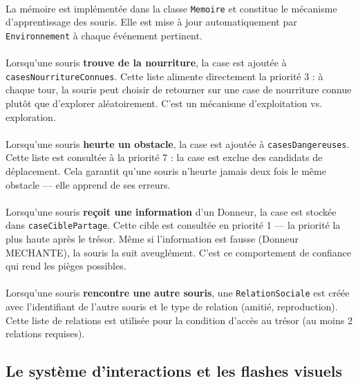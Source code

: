 \paragraph{} La mémoire est implémentée dans la classe \texttt{Memoire} et constitue le mécanisme d'apprentissage des souris. Elle est mise à jour automatiquement par \texttt{Environnement} à chaque événement pertinent.

\paragraph{} Lorsqu'une souris \textbf{trouve de la nourriture}, la case est ajoutée à \texttt{casesNourritureConnues}. Cette liste alimente directement la priorité 3 : à chaque tour, la souris peut choisir de retourner sur une case de nourriture connue plutôt que d'explorer aléatoirement. C'est un mécanisme d'exploitation vs. exploration.

\paragraph{} Lorsqu'une souris \textbf{heurte un obstacle}, la case est ajoutée à \texttt{casesDangereuses}. Cette liste est consultée à la priorité 7 : la case est exclue des candidats de déplacement. Cela garantit qu'une souris n'heurte jamais deux fois le même obstacle --- elle apprend de ses erreurs.

\paragraph{} Lorsqu'une souris \textbf{reçoit une information} d'un Donneur, la case est stockée dans \texttt{caseCiblePartage}. Cette cible est consultée en priorité 1 --- la priorité la plus haute après le trésor. Même si l'information est fausse (Donneur MECHANTE), la souris la suit aveuglément. C'est ce comportement de confiance qui rend les pièges possibles.

\paragraph{} Lorsqu'une souris \textbf{rencontre une autre souris}, une \texttt{RelationSociale} est créée avec l'identifiant de l'autre souris et le type de relation (amitié, reproduction). Cette liste de relations est utilisée pour la condition d'accès au trésor (au moins 2 relations requises).

\bigskip

\subsection{Le système d'interactions et les flashes visuels}

